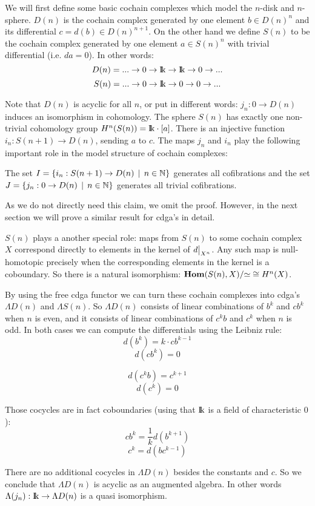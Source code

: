 
We will first define some basic cochain complexes which model the $n$-disk and $n$-sphere. $D(n)$ is the cochain complex generated by one element $b \in D(n)^n$ and its differential $c = d(b) \in D(n)^{n+1}$. On the other hand we define $S(n)$ to be the cochain complex generated by one element $a \in S(n)^n$ with trivial differential (i.e. $d a = 0$). In other words:
$$ D(n) = ... \to 0 \to \mathrm{I\!k} \to \mathrm{I\!k} \to 0 \to ... $$
$$ S(n) = ... \to 0 \to \mathrm{I\!k} \to 0 \to 0 \to ... $$

Note that $D(n)$ is acyclic for all $n$, or put in different words: $j_n : 0 \to D(n)$ induces an isomorphism in cohomology. The sphere $S(n)$ has exactly one non-trivial cohomology group $H^n(S(n)) = \mathrm{I\!k} \cdot [a]$. There is an injective function $i_n : S(n+1) \to D(n)$, sending $a$ to $c$. The maps $j_n$ and $i_n$ play the following important role in the model structure of cochain complexes:

\begin{claim}
	The set $I = \{i_n : S(n+1) \to D(n) \,\mid\, n \in \mathbb{N}\}$ generates all cofibrations and the set $J = \{j_n : 0 \to D(n) \,\mid\, n \in \mathbb{N}\}$ generates all trivial cofibrations.
\end{claim}

As we do not directly need this claim, we omit the proof. However, in the next section we will prove a similar result for cdga's in detail.

$S(n)$ plays a another special role: maps from $S(n)$ to some cochain complex $X$ correspond directly to elements in the kernel of $\restr{d}{X^n}$. Any such map is null-homotopic precisely when the corresponding elements in the kernel is a coboundary. So there is a natural isomorphism: $\mathbf{Hom}(S(n), X) / {\simeq} \cong H^n(X)$.

By using the free cdga functor we can turn these cochain complexes into cdga's $\Lambda D(n)$ and $\Lambda S(n) $. So $\Lambda D(n)$ consists of linear combinations of $b^k$ and $c b^k$ when $n$ is even, and it consists of linear combinations of $c^k b$ and $c^k$ when $n$ is odd. In both cases we can compute the differentials using the Leibniz rule:
$$ d(b^k) = k \cdot c b^{k-1} $$
$$ d(c b^k) = 0 $$

$$ d(c^k b) = c^{k+1} $$
$$ d(c^k) = 0 $$

Those cocycles are in fact coboundaries (using that $\mathrm{I\!k}$ is a field of characteristic $0$):
$$ c b^k = \frac{1}{k} d(b^{k+1}) $$
$$ c^k = d(b c^{k-1}) $$

There are no additional cocycles in $\Lambda D(n)$ besides the constants and $c$. So we conclude that $\Lambda D(n)$ is acyclic as an augmented algebra. In other words $\Lambda(j_n): \mathrm{I\!k} \to \Lambda D(n)$ is a quasi isomorphism.

